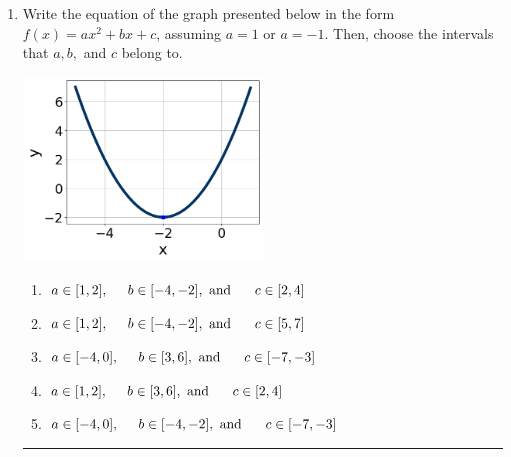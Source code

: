 \documentclass[14pt]{extbook}
\newcommand{\litem}[1]{\item#1\hspace*{-1cm}\rule{\textwidth}{0.4pt}}
\begin{document}
\begin{enumerate}
{\begin{enumerate}[label=\Alph*.]
\end{enumerate} }
\litem{
Write the equation of the graph presented below in the form $f(x)=ax^2+bx+c$, assuming  $a=1$ or $a=-1$. Then, choose the intervals that $a, b,$ and $c$ belong to.
\begin{center}
    \includegraphics[width=0.5\textwidth]{../Figures/quadraticGraphToEquationCopyA.png}
\end{center}
\begin{enumerate}[label=\Alph*.]
\item \( a \in [1, 2], \hspace*{5mm} b \in [-4, -2], \text{ and } \hspace*{5mm} c \in [2, 4] \)
\item \( a \in [1, 2], \hspace*{5mm} b \in [-4, -2], \text{ and } \hspace*{5mm} c \in [5, 7] \)
\item \( a \in [-4, 0], \hspace*{5mm} b \in [3, 6], \text{ and } \hspace*{5mm} c \in [-7, -3] \)
\item \( a \in [1, 2], \hspace*{5mm} b \in [3, 6], \text{ and } \hspace*{5mm} c \in [2, 4] \)
\item \( a \in [-4, 0], \hspace*{5mm} b \in [-4, -2], \text{ and } \hspace*{5mm} c \in [-7, -3] \)


\end{enumerate}}
\end{enumerate}
\end{document}
